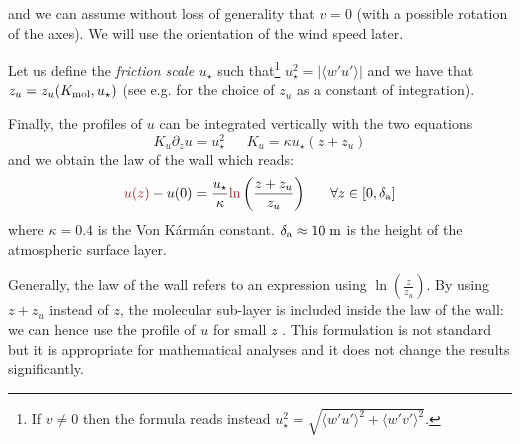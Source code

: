 and we can assume without loss of generality that $v=0$
(with a possible rotation of the axes).
We will use the orientation of the wind speed later.
\par
Let us define the \textit{friction scale} $u_\star$
such that\footnote{If $v\neq 0$ then
the formula reads instead $u_\star^2=\sqrt{\langle w' {u'} \rangle^2
+\langle w' {v'} \rangle^2 }$.}
$u_\star^2 = |\langle w' {u'} \rangle|$ and
we have that $z_{u} = z_{u}(K_{\rm mol}, u_\star)$
(see e.g. \citep{schlichting_boundary_1960}
for the choice of $z_{u}$ as a constant
of integration).
\par
Finally, the profiles of $u$ can be integrated vertically with
the two equations
\begin{equation}
	K_u\partial_z u=u_\star^2 ~~~~~~~
	K_u= \kappa u_\star (z+z_u)
\end{equation}
and we obtain the law of the wall which reads:
\begin{equation}
	\label{eq:airseaSCM_LawOfWallProfile}
	\emphase{u(z)} - u(0) = \frac{u_\star}{\kappa}
	\emphase{\ln}\left(\frac{z+z_u}{z_u}\right)
	~~~~~ \forall z\in [0,\delta_{\rm a}]
\end{equation}
where $\kappa = 0.4$ is the Von K\'arm\'an constant. 
$\delta_{\rm a} \approx 10\;{\rm m}$ is the height of
the atmospheric surface layer.
\begin{remark}
	Generally, the law of the wall
	refers to an expression using
	$\ln(\frac{z}{z_u})$. By using $z+z_u$
	instead of $z$,
	the molecular sub-layer is included
	inside the law of the wall: we can hence
	use the profile of $u$ for small $z$
	\citep{pelletier_two-sided_2021}.
	This formulation is not standard but it is
	appropriate for mathematical analyses and
	it does not change the results
	significantly.
\end{remark}
